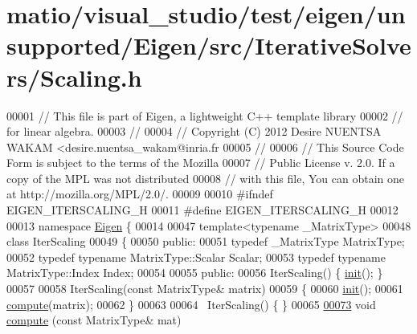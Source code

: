 \hypertarget{matio_2visual__studio_2test_2eigen_2unsupported_2_eigen_2src_2_iterative_solvers_2_scaling_8h_source}{}\section{matio/visual\+\_\+studio/test/eigen/unsupported/\+Eigen/src/\+Iterative\+Solvers/\+Scaling.h}
\label{matio_2visual__studio_2test_2eigen_2unsupported_2_eigen_2src_2_iterative_solvers_2_scaling_8h_source}

\begin{DoxyCode}
00001 \textcolor{comment}{// This file is part of Eigen, a lightweight C++ template library}
00002 \textcolor{comment}{// for linear algebra.}
00003 \textcolor{comment}{//}
00004 \textcolor{comment}{// Copyright (C) 2012 Desire NUENTSA WAKAM <desire.nuentsa\_wakam@inria.fr}
00005 \textcolor{comment}{//}
00006 \textcolor{comment}{// This Source Code Form is subject to the terms of the Mozilla}
00007 \textcolor{comment}{// Public License v. 2.0. If a copy of the MPL was not distributed}
00008 \textcolor{comment}{// with this file, You can obtain one at http://mozilla.org/MPL/2.0/.}
00009 
00010 \textcolor{preprocessor}{#ifndef EIGEN\_ITERSCALING\_H}
00011 \textcolor{preprocessor}{#define EIGEN\_ITERSCALING\_H}
00012 
00013 \textcolor{keyword}{namespace }\hyperlink{namespace_eigen}{Eigen} \{
00014 
00047 \textcolor{keyword}{template}<\textcolor{keyword}{typename} \_MatrixType>
00048 \textcolor{keyword}{class }IterScaling
00049 \{
00050   \textcolor{keyword}{public}:
00051     \textcolor{keyword}{typedef} \_MatrixType MatrixType; 
00052     \textcolor{keyword}{typedef} \textcolor{keyword}{typename} MatrixType::Scalar Scalar;
00053     \textcolor{keyword}{typedef} \textcolor{keyword}{typename} MatrixType::Index Index;
00054     
00055   \textcolor{keyword}{public}:
00056     IterScaling() \{ \hyperlink{structinit}{init}(); \}
00057     
00058     IterScaling(\textcolor{keyword}{const} MatrixType& matrix)
00059     \{
00060       \hyperlink{structinit}{init}();
00061       \hyperlink{class_eigen_1_1_iter_scaling_a6a76754399fd004b3ac6011e272ffb71}{compute}(matrix);
00062     \}
00063     
00064     ~IterScaling() \{ \}
00065     
\hyperlink{class_eigen_1_1_iter_scaling_a6a76754399fd004b3ac6011e272ffb71}{00073}     \textcolor{keywordtype}{void} \hyperlink{class_eigen_1_1_iter_scaling_a6a76754399fd004b3ac6011e272ffb71}{compute} (\textcolor{keyword}{const} MatrixType& mat)

\end{DoxyCode}
